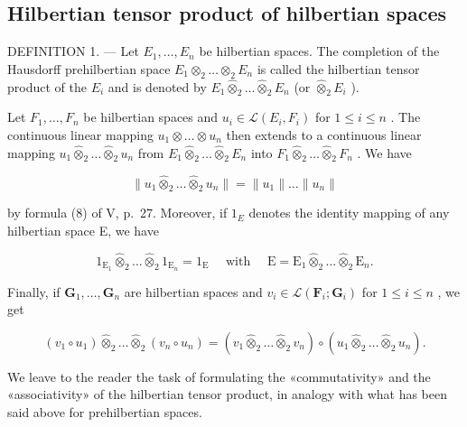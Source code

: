 \subsection{Hilbertian tensor product of hilbertian spaces}

DEFINITION 1. --- Let \(E_{1}, \ldots, E_{n}\) be hilbertian spaces. The completion of the Hausdorff prehilbertian space \(E_{1} \otimes_{2} \ldots \otimes_{2} E_{n}\) is called the hilbertian tensor product of the \(E_{i}\) and is denoted by \(E_{1} \hat{\otimes}_{2} \ldots \hat{\otimes}_{2} E_{n}\) (or \(\hat{\otimes}_{2} E_{i}\) ).

Let \(F_{1}, \ldots, F_{n}\) be hilbertian spaces and \(u_{i} \in \mathcal{L}(E_{i}, F_{i})\) for \(1 \leqslant i \leqslant n\) . The continuous linear mapping \(u_{1} \otimes \ldots \otimes u_{n}\) then extends to a continuous linear mapping \(u_{1} \hat{\otimes}_{2} \ldots \hat{\otimes}_{2} u_{n}\) from \(E_{1} \hat{\otimes}_{2} \ldots \hat{\otimes}_{2} E_{n}\) into \(F_{1} \hat{\otimes}_{2} \ldots \hat{\otimes}_{2} F_{n}\) . We have

\[
\| u _ {1} \hat {\otimes} _ {2} \dots \hat {\otimes} _ {2} u _ {n} \| = \| u _ {1} \| \dots \| u _ {n} \|\tag{10}
\]

by formula (8) of V, p.~27. Moreover, if \(1_{E}\) denotes the identity mapping of any hilbertian space E, we have

\[
1 _ {\mathrm{E} _ {1}} \hat {\otimes} _ {2} \dots \hat {\otimes} _ {2} 1 _ {\mathrm{E} _ {n}} = 1 _ {\mathrm{E}} \quad \text { with } \quad \mathrm{E} = \mathrm{E} _ {1} \hat {\otimes} _ {2} \dots \hat {\otimes} _ {2} \mathrm{E} _ {n}.\tag{11}
\]

Finally, if \(\mathbf{G}_1, \ldots, \mathbf{G}_n\) are hilbertian spaces and \(v_i \in \mathcal{L}(\mathbf{F}_i; \mathbf{G}_i)\) for \(1 \leqslant i \leqslant n\) , we get

\[
\left(v _ {1} \circ u _ {1}\right) \hat {\otimes} _ {2} \dots \hat {\otimes} _ {2} \left(v _ {n} \circ u _ {n}\right) = \left(v _ {1} \hat {\otimes} _ {2} \dots \hat {\otimes} _ {2} v _ {n}\right) \circ \left(u _ {1} \hat {\otimes} _ {2} \dots \hat {\otimes} _ {2} u _ {n}\right).\tag{12}
\]

We leave to the reader the task of formulating the «commutativity» and the «associativity» of the hilbertian tensor product, in analogy with what has been said above for prehilbertian spaces.


